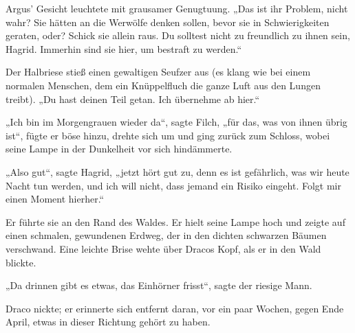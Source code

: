 Argus’ Gesicht leuchtete mit grausamer Genugtuung. „Das ist ihr Problem, nicht wahr? Sie hätten an die Werwölfe denken sollen, bevor sie in Schwierigkeiten geraten, oder? Schick sie allein raus. Du solltest nicht zu freundlich zu ihnen sein, Hagrid. Immerhin sind sie hier, um bestraft zu werden.“

Der Halbriese stieß einen gewaltigen Seufzer aus (es klang wie bei einem normalen Menschen, dem ein Knüppelfluch die ganze Luft aus den Lungen treibt). „Du hast deinen Teil getan. Ich übernehme ab hier.“

„Ich bin im Morgengrauen wieder da“, sagte Filch, „für das, was von ihnen übrig ist“, fügte er böse hinzu, drehte sich um und ging zurück zum Schloss, wobei seine Lampe in der Dunkelheit vor sich hindämmerte.

„Also gut“, sagte Hagrid, „jetzt hört gut zu, denn es ist gefährlich, was wir heute Nacht tun werden, und ich will nicht, dass jemand ein Risiko eingeht. Folgt mir einen Moment hierher.“

Er führte sie an den Rand des Waldes. Er hielt seine Lampe hoch und zeigte auf einen schmalen, gewundenen Erdweg, der in den dichten schwarzen Bäumen verschwand. Eine leichte Brise wehte über Dracos Kopf, als er in den Wald blickte.

„Da drinnen gibt es etwas, das Einhörner frisst“, sagte der riesige Mann.

Draco nickte; er erinnerte sich entfernt daran, vor ein paar Wochen, gegen Ende April, etwas in dieser Richtung gehört zu haben.

